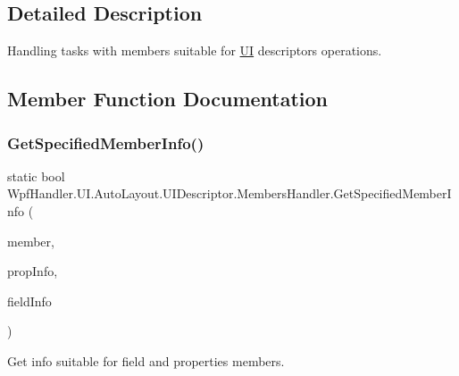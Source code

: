\subsection{Detailed Description}
Handling tasks with members suitable for \mbox{\hyperlink{namespace_wpf_handler_1_1_u_i}{UI}} descriptor\textquotesingle{}s operations. 



\subsection{Member Function Documentation}
\mbox{\label{class_wpf_handler_1_1_u_i_1_1_auto_layout_1_1_u_i_descriptor_1_1_members_handler_ab01eefa74f07555d76c813ac0f104b54}} 
\subsubsection{\texorpdfstring{Get\+Specified\+Member\+Info()}{GetSpecifiedMemberInfo()}}
{\footnotesize\ttfamily static bool Wpf\+Handler.\+U\+I.\+Auto\+Layout.\+U\+I\+Descriptor.\+Members\+Handler.\+Get\+Specified\+Member\+Info (\begin{DoxyParamCaption}\item[{Member\+Info}]{member,  }\item[{out Property\+Info}]{prop\+Info,  }\item[{out Field\+Info}]{field\+Info }\end{DoxyParamCaption})\hspace{0.3cm}{\ttfamily [static]}}



Get info suitable for field and properties members. 


